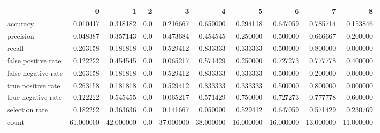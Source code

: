 \begin{tabular}{lrrrrrrrrr}
\toprule
{} &          0 &          1 &    2 &          3 &          4 &          5 &          6 &          7 &          8 \\
\midrule
accuracy            &   0.010417 &   0.318182 &  0.0 &   0.216667 &   0.650000 &   0.294118 &   0.647059 &   0.785714 &   0.153846 \\
precision           &   0.048387 &   0.357143 &  0.0 &   0.473684 &   0.454545 &   0.250000 &   0.500000 &   0.666667 &   0.200000 \\
recall              &   0.263158 &   0.181818 &  0.0 &   0.529412 &   0.833333 &   0.333333 &   0.500000 &   0.800000 &   0.000000 \\
false positive rate &   0.122222 &   0.454545 &  0.0 &   0.065217 &   0.571429 &   0.250000 &   0.727273 &   0.777778 &   0.400000 \\
false negative rate &   0.263158 &   0.181818 &  0.0 &   0.529412 &   0.833333 &   0.333333 &   0.500000 &   0.200000 &   0.000000 \\
true positive rate  &   0.263158 &   0.181818 &  0.0 &   0.529412 &   0.833333 &   0.333333 &   0.500000 &   0.800000 &   0.000000 \\
true negative rate  &   0.122222 &   0.545455 &  0.0 &   0.065217 &   0.571429 &   0.750000 &   0.727273 &   0.777778 &   0.600000 \\
selection rate      &   0.182292 &   0.363636 &  0.0 &   0.141667 &   0.050000 &   0.529412 &   0.647059 &   0.571429 &   0.230769 \\
count               &  61.000000 &  42.000000 &  0.0 &  37.000000 &  38.000000 &  16.000000 &  16.000000 &  13.000000 &  11.000000 \\
\bottomrule
\end{tabular}
